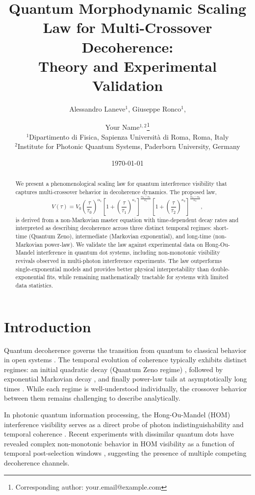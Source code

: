 \documentclass[12pt,a4paper]{article}
\title{\textbf{Quantum Morphodynamic Scaling Law for Multi-Crossover Decoherence:\\
Theory and Experimental Validation}}
\author{
Alessandro Laneve$^{1}$, Giuseppe Ronco$^{1}$, 
\and Your Name$^{1,2}$\thanks{Corresponding author: your.email@example.com}
\\
$^1$Dipartimento di Fisica, Sapienza Università di Roma, Roma, Italy\\
$^2$Institute for Photonic Quantum Systems, Paderborn University, Germany
}
\date{\today}
\begin{document}
\maketitle

\begin{abstract}
\noindent
We present a phenomenological scaling law for quantum interference visibility that captures multi-crossover behavior in decoherence dynamics. The proposed law,
\begin{equation}
V(\tau) = V_0 \left(\frac{\tau}{\tau_0}\right)^{\alpha_1} 
\left[1+\left(\frac{\tau}{\tau_1}\right)^{\kappa_1}\right]^{\frac{\alpha_2-\alpha_1}{\kappa_1}}
\left[1+\left(\frac{\tau}{\tau_2}\right)^{\kappa_2}\right]^{\frac{\alpha_3-\alpha_2}{\kappa_2}},
\end{equation}
is derived from a non-Markovian master equation with time-dependent decay rates and interpreted as describing decoherence across three distinct temporal regimes: short-time (Quantum Zeno), intermediate (Markovian exponential), and long-time (non-Markovian power-law). We validate the law against experimental data on Hong-Ou-Mandel interference in quantum dot systems, including non-monotonic visibility revivals observed in multi-photon interference experiments. The law outperforms single-exponential models and provides better physical interpretability than double-exponential fits, while remaining mathematically tractable for systems with limited data statistics.
\end{abstract}

\section{Introduction}

Quantum decoherence governs the transition from quantum to classical behavior in open systems \cite{Zurek2003}. The temporal evolution of coherence typically exhibits distinct regimes: an initial quadratic decay (Quantum Zeno regime) \cite{Facchi2008}, followed by exponential Markovian decay \cite{Breuer2002}, and finally power-law tails at asymptotically long times \cite{Uchiyama2016}. While each regime is well-understood individually, the crossover behavior between them remains challenging to describe analytically.

In photonic quantum information processing, the Hong-Ou-Mandel (HOM) interference visibility serves as a direct probe of photon indistinguishability and temporal coherence \cite{Hong1987}. Recent experiments with dissimilar quantum dots have revealed complex non-monotonic behavior in HOM visibility as a function of temporal post-selection windows \cite{Laneve2025}, suggesting the presence of multiple competing decoherence channels.
\end{document}
